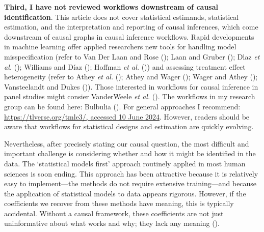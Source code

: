 \documentclass[
  single column]{article}
\begin{document}
\textbf{Third, I have not reviewed workflows downstream of causal
identification}. This article does not cover statistical estimands,
statistical estimation, and the interpretation and reporting of causal
inferences, which come downstream of causal graphs in causal inference
workflows. Rapid developments in machine learning offer applied
researchers new tools for handling model misspecification (refer to Van
Der Laan and Rose (); Laan and Gruber
(); Dı́az \emph{et al.}
(); Williams and Díaz
(); Hoffman \emph{et al.}
()) and assessing treatment effect
heterogeneity (refer to Athey \emph{et al.}
(); Athey and Wager
(); Wager and Athey
(); Vansteelandt and Dukes
()). Those interested in workflows
for causal inference in panel studies might consier VanderWeele \emph{et
al.} (). The workflows in my
research group can be found here: Bulbulia
(). For general approaches I
recommend: \href{https://tlverse.org/tmle3/}{https://tlverse.org/tmle3/,
accessed 10 June 2024}. However, readers should be aware that workflows
for statistical designs and estimation are quickly evolving.

Nevertheless, after precisely stating our causal question, the most
difficult and important challenge is considering whether and how it
might be identified in the data. The `statistical models first' approach
routinely applied in most human sciences is soon ending. This approach
has been attractive because it is relatively easy to implement---the
methods do not require extensive training---and because the application
of statistical models to data appears rigorous. However, if the
coefficients we recover from these methods have meaning, this is
typically accidental. Without a causal framework, these coefficients are
not just uninformative about what works and why; they lack any meaning
().
\end{document}
